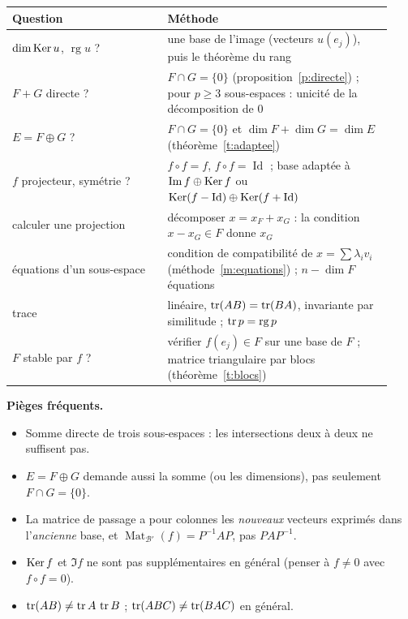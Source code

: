 \documentclass[a4paper,11pt]{article}
\numberwithin{equation}{section}
\numberwithin{figure}{section}
\numberwithin{table}{section}
\theoremstyle{enonce}
\theoremstyle{exemple}
\theoremstyle{remarque}
\newcommand{\rg}{\operatorname{rg}}
\newcommand{\Mat}{\operatorname{Mat}}
\newcommand{\Id}{\operatorname{Id}}
\begin{document}
\begin{center}
\renewcommand{\arraystretch}{1.35}
\small
\begin{tabular}{p{0.38\linewidth}p{0.55\linewidth}}
\hline
\textbf{Question} & \textbf{Méthode}\\\hline
$\dim\operatorname{Ker} u$, $\rg u$ ? & une base de l'image (vecteurs $u(e_j)$), puis le théorème du rang\\
$F+G$ directe ? & $F\cap G=\{0\}$ (proposition~\ref{p:directe}) ; pour $p\geq3$ sous-espaces : unicité de la décomposition de $0$\\
$E=F\oplus G$ ? & $F\cap G=\{0\}$ et $\dim F+\dim G=\dim E$ (théorème~\ref{t:adaptee})\\
$f$ projecteur, symétrie ? & $f\circ f=f$, $f\circ f=\Id$ ; base adaptée à $\operatorname{Im} f\oplus\operatorname{Ker} f$ ou $\Ker(f-\Id)\oplus\Ker(f+\Id)$\\
calculer une projection & décomposer $x=x_F+x_G$ : la condition $x-x_G\in F$ donne $x_G$\\
équations d'un sous-espace & condition de compatibilité de $x=\sum\lambda_iv_i$ (méthode~\ref{m:equations}) ; $n-\dim F$ équations\\
trace & linéaire, $\operatorname{tr}(AB)=\operatorname{tr}(BA)$, invariante par similitude ; $\tr p=\rg p$\\
$F$ stable par $f$ ? & vérifier $f(e_j)\in F$ sur une base de $F$ ; matrice triangulaire par blocs (théorème~\ref{t:blocs})\\\hline
\end{tabular}
\end{center}

\begin{attention}\textbf{Pièges fréquents.}
\begin{itemize}[leftmargin=1.1em]
\item Somme directe de trois sous-espaces : les intersections deux à deux ne suffisent pas.
\item $E=F\oplus G$ demande aussi la somme (ou les dimensions), pas seulement $F\cap G=\{0\}$.
\item La matrice de passage a pour colonnes les \emph{nouveaux} vecteurs exprimés dans l'\emph{ancienne} base, et
$\Mat_{\mathcal B'}(f)=P^{-1}AP$, pas $PAP^{-1}$.
\item $\operatorname{Ker} f$ et $\Im f$ ne sont pas supplémentaires en général (penser à $f\neq0$ avec $f\circ f=0$).
\item $\operatorname{tr}(AB)\neq\operatorname{tr} A\,\operatorname{tr} B$ ; $\operatorname{tr}(ABC)\neq\operatorname{tr}(BAC)$ en général.
\end{itemize}
\end{attention}
\end{document}
